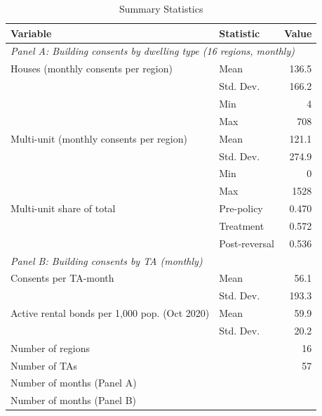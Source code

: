 \begin{table}[t]
\centering
\caption{Summary Statistics}
\label{tab:summary}
\begin{tabular}{llr}
\toprule
Variable & Statistic & Value \\
\midrule
\midrule
\multicolumn{3}{l}{ \textit{Panel A: Building consents by dwelling type (16 regions, monthly)} } \\
Houses (monthly consents per region)  &  Mean  &  136.5  \\
  &  Std. Dev.  &  166.2  \\
  &  Min  &  4  \\
  &  Max  &  708  \\
Multi-unit (monthly consents per region)  &  Mean  &  121.1  \\
  &  Std. Dev.  &  274.9  \\
  &  Min  &  0  \\
  &  Max  &  1528  \\
Multi-unit share of total  &  Pre-policy  &  0.470  \\
  &  Treatment  &  0.572  \\
  &  Post-reversal  &  0.536  \\
\midrule
\multicolumn{3}{l}{ \textit{Panel B: Building consents by TA (monthly)} } \\
Consents per TA-month  &  Mean  &  56.1  \\
  &  Std. Dev.  &  193.3  \\
Active rental bonds per 1,000 pop. (Oct 2020)  &  Mean  &  59.9  \\
  &  Std. Dev.  &  20.2  \\
Number of regions  &    &  16  \\
Number of TAs  &    &  57  \\
\midrule
\multicolumn{3}{l}{ Number of months (Panel A) } \\
\midrule
\multicolumn{3}{l}{ Number of months (Panel B) } \\
\bottomrule
\end{tabular}
\end{table}

